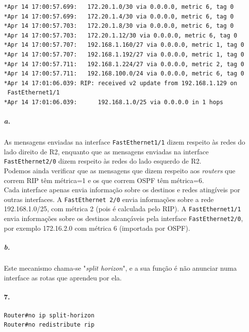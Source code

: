 \begin{verbatim}
*Apr 14 17:00:57.699: 	172.20.1.0/30 via 0.0.0.0, metric 6, tag 0
*Apr 14 17:00:57.699: 	172.20.1.4/30 via 0.0.0.0, metric 6, tag 0
*Apr 14 17:00:57.703: 	172.20.1.8/30 via 0.0.0.0, metric 6, tag 0
*Apr 14 17:00:57.703: 	172.20.1.12/30 via 0.0.0.0, metric 6, tag 0
*Apr 14 17:00:57.707: 	192.168.1.160/27 via 0.0.0.0, metric 1, tag 0
*Apr 14 17:00:57.707: 	192.168.1.192/27 via 0.0.0.0, metric 1, tag 0
*Apr 14 17:00:57.711: 	192.168.1.224/27 via 0.0.0.0, metric 2, tag 0
*Apr 14 17:00:57.711: 	192.168.100.0/24 via 0.0.0.0, metric 6, tag 0
*Apr 14 17:01:06.039: RIP: received v2 update from 192.168.1.129 on
 FastEthernet1/1
*Apr 14 17:01:06.039:      192.168.1.0/25 via 0.0.0.0 in 1 hops
\end{verbatim}

\subparagraph{a.}
As mensagens enviadas na interface \texttt{FastEthernet1/1} dizem respeito às redes do lado direito de \textsf{R2}, enquanto que as mensagens enviadas na interface \texttt{FastEthernet2/0} dizem respeito às redes do lado esquerdo de \textsf{R2}.\\
Podemos ainda verificar que as mensagens que dizem respeito aos \emph{routers} que correm RIP têm métrica=1 e os que correm OSPF têm métrica=6.\\
Cada interface apenas envia informação sobre os destinos e redes atingíveis por outras interfaces. A \texttt{FastEthernet 2/0} envia informações sobre a rede 192.168.1.0/25, com métrica 2 (pois é calculada pelo RIP). A \texttt{FastEthernet1/1} envia informações sobre os destinos alcançáveis pela interface \texttt{FastEthernet2/0}, por exemplo 172.16.2.0 com métrica 6 (importada por OSPF).

\subparagraph{b.}
Este mecanismo chama-se "\emph{split horizon}", e a sua função é não anunciar numa interface as rotas que aprendeu por ela.

\paragraph{7.}
\begin{verbatim}
Router#no ip split-horizon
Router#no redistribute rip
\end{verbatim}

